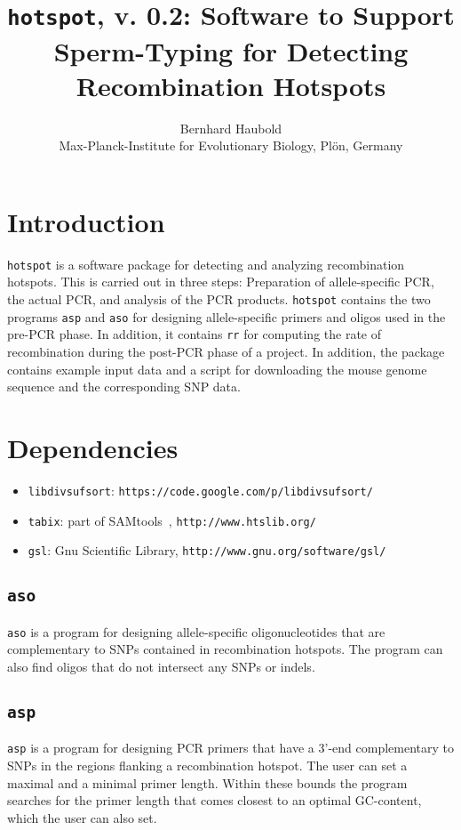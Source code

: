 \documentclass{article}
\newcommand{\bi}{\begin{itemize}}
\newcommand{\ei}{\end{itemize}}
\newcommand{\I}{\item}
\newcommand{\ty}{\texttt}
\newcommand{\version}{0.2}
\begin{document}
\title{\ty{hotspot}, v. \version: Software to Support Sperm-Typing for
Detecting Recombination Hotspots}
\author{Bernhard Haubold\\\small Max-Planck-Institute for Evolutionary Biology, Pl\"on, Germany}
\maketitle
\section{Introduction}
\ty{hotspot} is a software package for detecting and analyzing
recombination hotspots. This is carried out in three steps:
Preparation of allele-specific PCR, the actual PCR, and analysis of
the PCR products. \ty{hotspot} contains the two programs \ty{asp} and \ty{aso} for designing
allele-specific primers and oligos used in the pre-PCR phase. In
addition, it contains \ty{rr} for computing the rate of recombination
during the post-PCR phase of a project. In addition, the package
contains example input data and a script for downloading the mouse
genome sequence and the corresponding SNP data.

\section{Dependencies}
\bi
\I \ty{libdivsufsort}: \ty{https://code.google.com/p/libdivsufsort/}
\I \ty{tabix}: part of SAMtools~\cite{li09:seq},
\ty{http://www.htslib.org/}
\I \ty{gsl}: Gnu Scientific Library, \ty{http://www.gnu.org/software/gsl/}
\ei

\subsection{\ty{aso}}
\ty{aso} is a program for designing allele-specific oligonucleotides that are
complementary to SNPs contained in recombination hotspots. The program
can also find oligos that do not intersect any SNPs or indels. 

\subsection{\ty{asp}}
\ty{asp} is a program for designing PCR primers that have a 3'-end
complementary to SNPs in the regions flanking a recombination
hotspot. The user can set a maximal and a minimal primer
length. Within these bounds the program searches for the primer length
that comes closest to an optimal GC-content, which the user can also
set.
\end{document}

